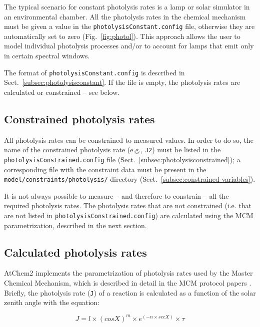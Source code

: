 The typical scenario for constant photolysis rates is a lamp or solar
simulator in an environmental chamber. All the photolysis rates in the
chemical mechanism must be given a value in the
\texttt{photolysisConstant.config} file, otherwise they are
automatically set to zero (Fig.~\ref{fig:photol}).  This approach
allows the user to model individual photolysis processes and/or to
account for lamps that emit only in certain spectral windows.

The format of \texttt{photolysisConstant.config} is described in
Sect.~\ref{subsec:photolysisconstant}. If the file is empty, the
photolysis rates are calculated or constrained -- see below.

\subsection{Constrained photolysis rates} \label{subsec:constrained-photolysis-rates}

All photolysis rates can be constrained to measured values. In order
to do so, the name of the constrained photolysis rate (e.g.,
\texttt{J2}) must be listed in the
\texttt{photolysisConstrained.config} file
(Sect.~\ref{subsec:photolysisconstrained}); a corresponding file with
the constraint data must be present in the
\texttt{model/constraints/photolysis/} directory
(Sect.~\ref{subsec:constrained-variables}).

It is not always possible to measure -- and therefore to constrain --
all the required photolysis rates. The photolysis rates that are not
constrained (i.e. that are not listed in
\texttt{photolysisConstrained.config}) are calculated using the MCM
parametrization, described in the next section.

\subsection{Calculated photolysis rates} \label{subsec:calculated-photolysis-rates}

AtChem2 implements the parametrization of photolysis rates used by the
Master Chemical Mechanism, which is described in detail in the MCM
protocol papers \citep{jenkin_1997, saunders_2003}. Briefly, the
photolysis rate (\texttt{J}) of a reaction is calculated as a function
of the solar zenith angle with the equation:

\begin{equation}
  J = l \times (cosX)^m \times e^{(-n \times secX)} \times \tau
\end{equation}

